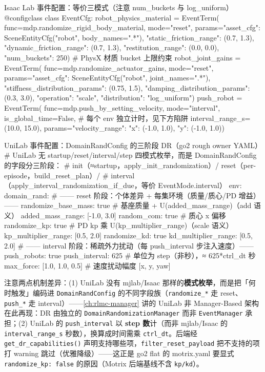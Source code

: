 \begin{codebox}[Python]{Isaac Lab 事件配置：等价三模式（注意 num\_buckets 与 log\_uniform）}
@configclass
class EventCfg:
    robot_physics_material = EventTerm(
        func=mdp.randomize_rigid_body_material, mode="reset",
        params={"asset_cfg": SceneEntityCfg("robot", body_names=".*"),
                "static_friction_range": (0.7, 1.3),
                "dynamic_friction_range": (0.7, 1.3),
                "restitution_range": (0.0, 0.0),
                "num_buckets": 250})           # PhysX 材质 bucket 上限约束
    robot_joint_gains = EventTerm(
        func=mdp.randomize_actuator_gains, mode="reset",
        params={"asset_cfg": SceneEntityCfg("robot", joint_names=".*"),
                "stiffness_distribution_params": (0.75, 1.5),
                "damping_distribution_params": (0.3, 3.0),
                "operation": "scale", "distribution": "log_uniform"})
    push_robot = EventTerm(
        func=mdp.push_by_setting_velocity, mode="interval",
        is_global_time=False,                  # 每个 env 独立计时，见下方陷阱
        interval_range_s=(10.0, 15.0),
        params={"velocity_range": {"x": (-1.0, 1.0), "y": (-1.0, 1.0)}})
\end{codebox}

\begin{codebox}[Python]{UniLab 事件配置：DomainRandConfig 的三阶段 DR（go2 rough owner YAML）}
# UniLab 无 startup/reset/interval/step 四模式枚举，而是 DomainRandConfig 的字段分三阶段：
#   init（≈startup，apply_init_randomization）/ reset（per-episode，build_reset_plan）/
#   interval（apply_interval_randomization_if_due，等价 EventMode.interval）
env:
  domain_rand:
    # —— reset 阶段：个体差异 + 每集环境（质量/质心/PD 增益）——
    randomize_base_mass: true                  # 基座质量 + U(added_mass_range)（add 语义）
    added_mass_range: [-1.0, 3.0]
    random_com: true                           # 质心 x 偏移
    randomize_kp: true                         # PD kp 乘 U(kp_multiplier_range)（scale 语义）
    kp_multiplier_range: [0.5, 2.0]
    randomize_kd: true
    kd_multiplier_range: [0.5, 2.0]
    # —— interval 阶段：稀疏外力扰动（每 push_interval 步注入速度）——
    push_robots: true
    push_interval: 625                         # 单位为 step（非秒），≈ 625*ctrl_dt 秒
    max_force: [1.0, 1.0, 0.5]                 # 速度扰动幅度 [x, y, yaw]
\end{codebox}

\noindent{}注意两点机制差异：(1) UniLab 没有 mjlab/Isaac 那样的\textbf{模式枚举}，而是把「何时触发」编码进 \verb|DomainRandConfig| 的不同字段族（\verb|randomize_*| 走 reset、\verb|push_*| 走 interval）——\cref{ch:rlmc-manager} 讲的 UniLab 非 Manager-Based 架构在此再现：DR 由独立的 \verb|DomainRandomizationManager| 而非 \verb|EventManager| 承担；(2) UniLab 的 \verb|push_interval| 以 \textbf{step 数}计（而非 mjlab/Isaac 的 \verb|interval_range_s| 秒数），换算成时间需乘 \verb|ctrl_dt|。后端经 \verb|get_dr_capabilities()| 声明支持哪些项，\verb|filter_reset_payload| 把不支持的项打 warning 跳过（优雅降级）——这正是 go2 flat 的 motrix.yaml 要显式 \verb|randomize_kp: false| 的原因（Motrix 后端基线不含 \verb|kp/kd|）。

